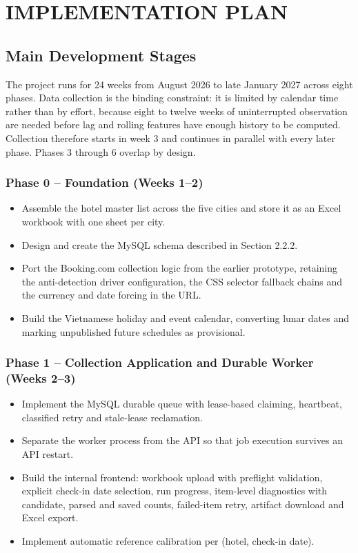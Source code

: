 \chapter{IMPLEMENTATION PLAN}

\section{Main Development Stages}

The project runs for 24 weeks from August 2026 to late January 2027 across eight phases. Data collection is the binding constraint: it is limited by calendar time rather than by effort, because eight to twelve weeks of uninterrupted observation are needed before lag and rolling features have enough history to be computed. Collection therefore starts in week 3 and continues in parallel with every later phase. Phases 3 through 6 overlap by design.

\subsection{Phase 0 -- Foundation (Weeks 1--2)}

\begin{itemize}[leftmargin=*]
    \item Assemble the hotel master list across the five cities and store it as an Excel workbook with one sheet per city.
    \item Design and create the MySQL schema described in Section 2.2.2.
    \item Port the Booking.com collection logic from the earlier prototype, retaining the anti-detection driver configuration, the CSS selector fallback chains and the currency and date forcing in the URL.
    \item Build the Vietnamese holiday and event calendar, converting lunar dates and marking unpublished future schedules as provisional.
\end{itemize}

\subsection{Phase 1 -- Collection Application and Durable Worker (Weeks 2--3)}

\begin{itemize}[leftmargin=*]
    \item Implement the MySQL durable queue with lease-based claiming, heartbeat, classified retry and stale-lease reclamation.
    \item Separate the worker process from the API so that job execution survives an API restart.
    \item Build the internal frontend: workbook upload with preflight validation, explicit check-in date selection, run progress, item-level diagnostics with candidate, parsed and saved counts, failed-item retry, artifact download and Excel export.
    \item Implement automatic reference calibration per (hotel, check-in date).
\end{itemize}

